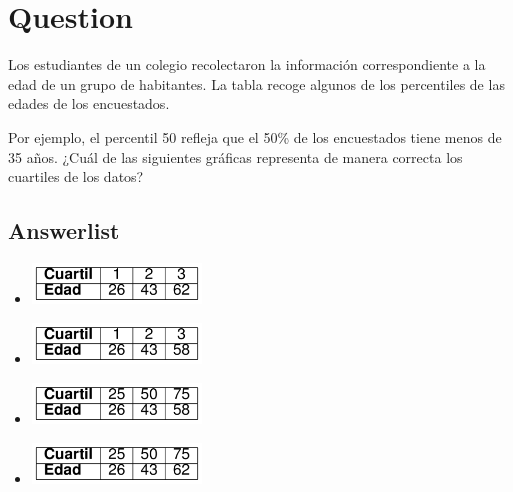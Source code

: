 \documentclass[
]{article}
\author{}
\date{\vspace{-2.5em}}
\begin{document}
\hypertarget{question}{%
\section{Question}\label{question}}

Los estudiantes de un colegio recolectaron la información
correspondiente a la edad de un grupo de habitantes. La tabla recoge
algunos de los percentiles de las edades de los encuestados.\\


Por ejemplo, el percentil 50 refleja que el 50\% de los encuestados
tiene menos de 35 años. ¿Cuál de las siguientes gráficas representa de
manera correcta los cuartiles de los datos?

\hypertarget{answerlist}{%
\subsection{Answerlist}\label{answerlist}}

\begin{itemize}
\item
  \includegraphics[width=4.5cm,height=\textheight]{image01.png}
\item
  \includegraphics[width=4.5cm,height=\textheight]{image02.png}
\item
  \includegraphics[width=4.5cm,height=\textheight]{image03.png}
\item
  \includegraphics[width=4.5cm,height=\textheight]{image04.png}
\end{itemize}
\end{document}
